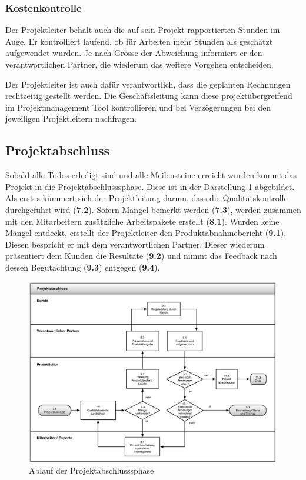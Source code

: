 \subsubsection{Kostenkontrolle}
Der Projektleiter behält auch die auf sein Projekt rapportierten Stunden im Auge.
Er kontrolliert laufend, ob für Arbeiten mehr Stunden als geschätzt aufgewendet
wurden. Je nach Grösse der Abweichung informiert er den verantwortlichen
Partner, die wiederum das weitere Vorgehen entscheiden.

Der Projektleiter ist auch dafür verantwortlich, dass die geplanten Rechnungen
rechtzeitig gestellt werden. Die Geschäftsleitung kann diese projektübergreifend
im Projektmanagement Tool kontrollieren und bei Verzögerungen bei den jeweiligen
Projektleitern nachfragen.

\subsection{Projektabschluss}
Sobald alle Todos erledigt sind und alle Meilensteine erreicht wurden kommt
das Projekt in die Projektabschlusssphase. Diese ist in der Darstellung 
\ref{pic:02_03_projektabschluss} abgebildet. Als erstes kümmert sich der
Projektleitung darum, dass die Qualitätskontrolle durchgeführt wird (\textbf{7.2}). 
Sofern Mängel bemerkt werden (\textbf{7.3}), werden zusammen mit den Mitarbeitern zusätzliche
Arbeitspakete erstellt (\textbf{8.1}). Wurden keine Mängel entdeckt, erstellt
der Projektleiter den Produktabnahmebericht (\textbf{9.1}). Diesen bespricht er mit dem
verantwortlichen Partner. Dieser wiederum präsentiert dem Kunden die Resultate (\textbf{9.2})
und nimmt das Feedback nach dessen Begutachtung (\textbf{9.3}) entgegen (\textbf{9.4}).

\begin{figure}[htbp]
\begin{center}
\includegraphics[width=0.99\textwidth,angle=0]{./bilder/loesung/02_03_projektabschluss.pdf}
\caption[Ablauf der Projektabschlusssphase]{Ablauf der Projektabschlusssphase\footnotemark}
\label{pic:02_03_projektabschluss}
\end{center}
\end{figure}

